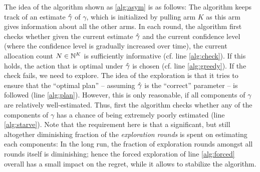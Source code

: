 The idea of the algorithm shown as \cref{alg:asym} is as follows:
The algorithm keeps track of an estimate $\hat{\gamma}$ of $\gamma$, which is initialized by pulling arm $K$ as this arm
gives information about all the other arms.
In each round, the algorithm first checks whether given the current estimate $\hat{\gamma}$ and the current confidence level (where the confidence level is gradually increased over time), the current allocation count $N\in \mathbb{N}^K$
is sufficiently informative (cf. line \ref{alg:check}). If this holds, the action that is optimal under $\hat{\gamma}$ is chosen 
(cf. line \ref{alg:greedy}). If the check fails, we need to explore.
The idea of the exploration is that it tries to ensure that the ``optimal plan'' -- assuming $\hat{\gamma}$ is the ``correct'' parameter -- is followed (line \ref{alg:plan}). However, this is only reasonable, if all components of $\gamma$ are relatively well-estimated.
Thus, first the algorithm checks whether any of the components of $\gamma$ has a chance of being
extremely poorly estimated (line \ref{alg:starve}). Note that the requirement here is that a significant, but still altogether diminishing fraction of the \emph{exploration rounds} is spent on estimating each components: In the long run, the fraction of exploration rounds amongst all rounds itself is diminishing; hence the forced exploration of line \ref{alg:forced} overall has a small impact on the regret, while it allows to stabilize the algorithm.

